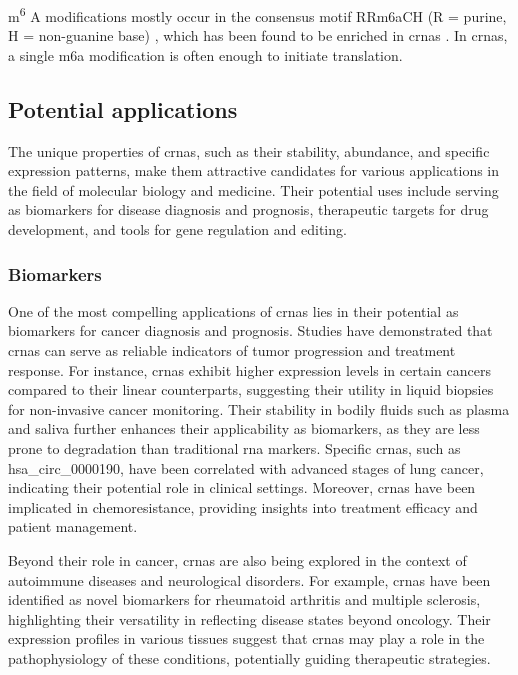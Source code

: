 m\textsuperscript{6}
A modifications mostly occur in the consensus motif RR\gls{m6a}CH (R = purine,
H = non-guanine base) \supercite{csepany_sequence_1990,harper_sequence_1990},
which has been found to be enriched in \glspl{crna}
\supercite{yang_extensive_2017}.
In \glspl{crna}, a single \gls{m6a} modification is often enough to initiate
translation\supercite{yang_extensive_2017}.

\subsection{Potential applications}
\label{sec:circrna_applications}
The unique properties of \glspl{crna}, such as their stability, abundance, and
specific expression patterns, make them attractive candidates for various
applications in the field of molecular biology and medicine.
Their potential uses include serving as biomarkers for disease diagnosis and
prognosis, therapeutic targets for drug development, and tools for gene
regulation and editing.

\subsubsection{Biomarkers}
One of the most compelling applications of \glspl{crna} lies in their potential
as biomarkers for cancer diagnosis and prognosis.
Studies have demonstrated that \glspl{crna} can serve as reliable indicators of
tumor progression and treatment response.
For instance, \glspl{crna} exhibit higher expression levels in certain cancers
compared to their linear counterparts, suggesting their utility in liquid
biopsies for non-invasive cancer
monitoring\supercite{bao_prognostic_2020,ren_construction_2017}.
Their stability in bodily fluids such as plasma and saliva further enhances
their applicability as biomarkers, as they are less prone to degradation than
traditional \gls{rna}
markers\supercite{bao_prognostic_2020,zhang_circular_2018}.
Specific \glspl{crna}, such as hsa\_circ\_0000190, have been correlated with
advanced stages of lung cancer, indicating their potential role in clinical
settings\supercite{luo_plasma_2020}.
Moreover, \glspl{crna} have been implicated in chemoresistance, providing
insights into treatment efficacy and patient
management\supercite{geng_function_2018,feng_functions_2019}.

Beyond their role in cancer, \glspl{crna} are also being explored in the
context of autoimmune diseases and neurological disorders.
For example, \glspl{crna} have been identified as novel biomarkers for
rheumatoid arthritis and multiple sclerosis, highlighting their versatility in
reflecting disease states beyond
oncology\supercite{ouyang_identification_2021,he_exosomal_2019}.
Their expression profiles in various tissues suggest that \glspl{crna} may play
a role in the pathophysiology of these conditions, potentially guiding
therapeutic strategies\supercite{mohammed_circular_2023}.

